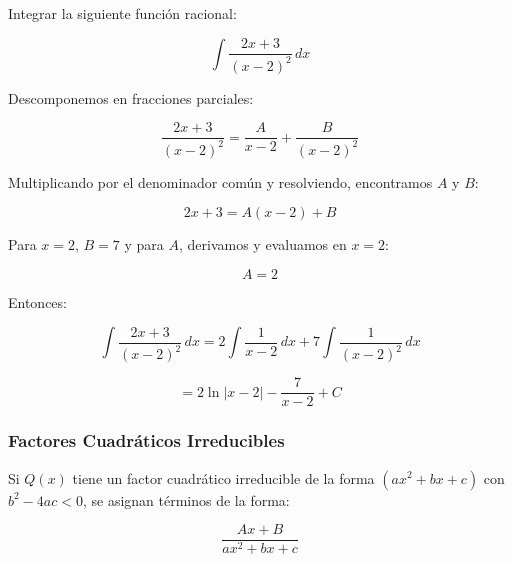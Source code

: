 \begin{example}
    Integrar la siguiente función racional:

\[
\int \frac{2x + 3}{(x - 2)^2} \, dx
\]

Descomponemos en fracciones parciales:

\[
\frac{2x + 3}{(x - 2)^2} = \frac{A}{x - 2} + \frac{B}{(x - 2)^2}
\]

Multiplicando por el denominador común y resolviendo, encontramos \( A \) y \( B \):

\[
2x + 3 = A(x - 2) + B
\]

Para \( x = 2 \), \( B = 7 \) y para \( A \), derivamos y evaluamos en \( x = 2 \):

\[
A = 2
\]

Entonces:

\[
\int \frac{2x + 3}{(x - 2)^2} \, dx = 2 \int \frac{1}{x - 2} \, dx + 7 \int \frac{1}{(x - 2)^2} \, dx
\]

\[
= 2 \ln |x - 2| - \frac{7}{x - 2} + C
\]
\end{example}

\subsubsection{Factores Cuadráticos Irreducibles}
Si \( Q(x) \) tiene un factor cuadrático irreducible de la forma \( (ax^2 + bx + c) \) con \( b^2 - 4ac < 0 \), se asignan términos de la forma:

\[
\frac{Ax + B}{ax^2 + bx + c}
\]

